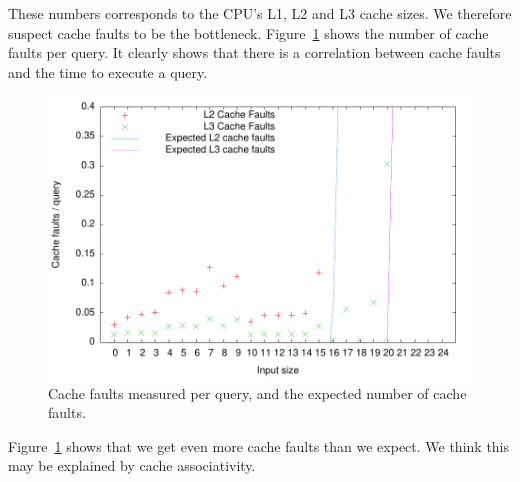 These numbers corresponds to the CPU's L1, L2 and L3 cache sizes. We
therefore suspect cache faults to be the
bottleneck. Figure~\ref{fig:bs_cachefaults} shows the number of cache
faults per query. It clearly shows that there is a correlation between cache faults and the time to execute a query.

\begin{figure}[h!]
  \label{fig:bs_cachefaults}
  \centering
  \includegraphics[width=\textwidth]{../week1/plots/outputs/bs_cachefaults}
  \caption{Cache faults measured per query, and the expected number of cache faults.}
\end{figure}

Figure~\ref{fig:bs_cachefaults} shows that we get even more cache
faults than we expect. We think this may be explained by cache
associativity.


